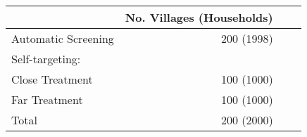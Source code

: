\begin{tabular}{lrrr}\toprule
 & \multicolumn{1}{c}{No. Villages (Households)}\\ \midrule 
Automatic Screening & 200 (1998)\\Self-targeting: & \\\hspace{2em} Close Treatment & 100 (1000) \\\hspace{2em} Far Treatment & 100 (1000) \\\hspace{4em} Total & 200 (2000) \\\bottomrule\end{tabular}
